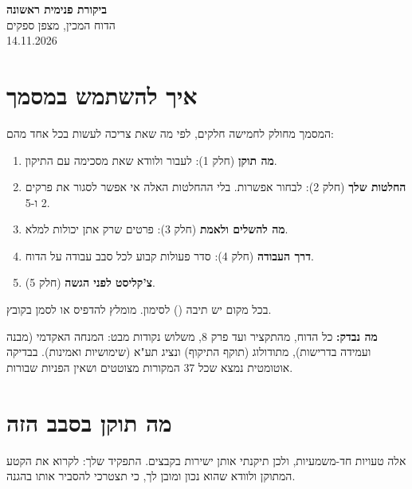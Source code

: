 \documentclass[11pt,a4paper]{article}
\newcommand{\cb}{\framebox[1.7ex]{\rule{0pt}{1.3ex}}}
\begin{document}
\begin{center}
{\LARGE \textbf{ביקורת פנימית ראשונה}}\\[4pt]
{\large הדוח המכין, מצפן ספקים}\\[2pt]
14.11.2026
\end{center}

\section*{איך להשתמש במסמך}
המסמך מחולק לחמישה חלקים, לפי מה שאת צריכה לעשות בכל אחד מהם:
\begin{enumerate}
\item \textbf{מה תוקן} (חלק 1): לעבור ולוודא שאת מסכימה עם התיקון.
\item \textbf{החלטות שלך} (חלק 2): לבחור אפשרות. בלי ההחלטות האלה אי אפשר לסגור את פרקים 2 ו-5.
\item \textbf{מה להשלים ולאמת} (חלק 3): פרטים שרק אתן יכולות למלא.
\item \textbf{דרך העבודה} (חלק 4): סדר פעולות קבוע לכל סבב עבודה על הדוח.
\item \textbf{צ'קליסט לפני הגשה} (חלק 5).
\end{enumerate}
בכל מקום יש תיבה (\cb) לסימון. מומלץ להדפיס או לסמן בקובץ.

\textbf{מה נבדק:} כל הדוח, מהתקציר ועד פרק 8, משלוש נקודות מבט: המנחה האקדמי (מבנה ועמידה בדרישות), מתודולוג (תוקף התיקוף) ונציג תע"א (שימושיות ואמינות). בבדיקה אוטומטית נמצא שכל 37 המקורות מצוטטים ושאין הפניות שבורות.

\section{מה תוקן בסבב הזה}
אלה טעויות חד-משמעיות, ולכן תיקנתי אותן ישירות בקבצים. התפקיד שלך: לקרוא את הקטע המתוקן ולוודא שהוא נכון ומובן לך, כי תצטרכי להסביר אותו בהגנה.
\end{document}
